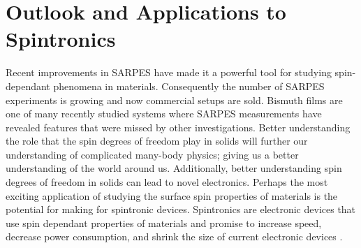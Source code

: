 \documentclass[12pt]{article}
\begin{document}
\section{Outlook and Applications to Spintronics}
Recent improvements in SARPES have made it a powerful tool for studying spin-dependant phenomena in materials.
Consequently the number of SARPES experiments is growing and now commercial setups are sold.
Bismuth films are one of many recently studied systems where SARPES measurements have revealed features that were missed by other investigations.
Better understanding the role that the spin degrees of freedom play in solids will further our understanding of complicated many-body physics; giving us a better understanding of the world around us.
Additionally, better understanding spin degrees of freedom in solids can lead to novel electronics.
Perhaps the most exciting application of studying the surface spin properties of materials is the potential for making for spintronic devices.
Spintronics are electronic devices that use spin dependant properties of materials and promise to increase speed, decrease power consumption, and shrink the size of current electronic devices \cite{wolf}.

\printbibliography
\end{document}
